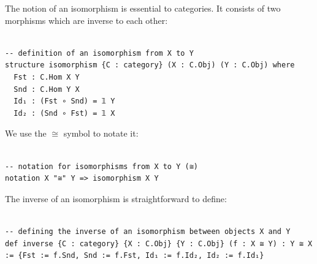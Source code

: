 \documentclass{book}
\newcounter{lcounter}
\begin{document}
The notion of an isomorphism is essential to categories. It consists of two morphisms which are inverse to each other:

\begin{center}
\begin{tcolorbox}[width=5in,colback={white},title={\begin{center}\texttt{Lean \thelcounter} \addtocounter{lcounter}{1}  \end{center}},colbacktitle=Blue,coltitle=black]
\begin{verbatim}

-- definition of an isomorphism from X to Y
structure isomorphism {C : category} (X : C.Obj) (Y : C.Obj) where
  Fst : C.Hom X Y
  Snd : C.Hom Y X
  Id₁ : (Fst ∘ Snd) = 𝟙 Y
  Id₂ : (Snd ∘ Fst) = 𝟙 X

\end{verbatim}%
\end{tcolorbox}
\end{center}

We use the $\cong$ symbol to notate it:

\begin{center}
\begin{tcolorbox}[width=5in,colback={white},title={\begin{center}\texttt{Lean \thelcounter} \addtocounter{lcounter}{1}  \end{center}},colbacktitle=Blue,coltitle=black]
\begin{verbatim}

-- notation for isomorphisms from X to Y (≅)
notation X "≅" Y => isomorphism X Y

\end{verbatim}%
\end{tcolorbox}
\end{center}

The inverse of an isomorphism is straightforward to define:

\begin{center}
\begin{tcolorbox}[width=5in,colback={white},title={\begin{center}\texttt{Lean \thelcounter} \addtocounter{lcounter}{1}  \end{center}},colbacktitle=Blue,coltitle=black]
\begin{verbatim}

-- defining the inverse of an isomorphism between objects X and Y
def inverse {C : category} {X : C.Obj} {Y : C.Obj} (f : X ≅ Y) : Y ≅ X := {Fst := f.Snd, Snd := f.Fst, Id₁ := f.Id₂, Id₂ := f.Id₁}

\end{verbatim}%
\end{tcolorbox}
\end{center}
\end{document}

